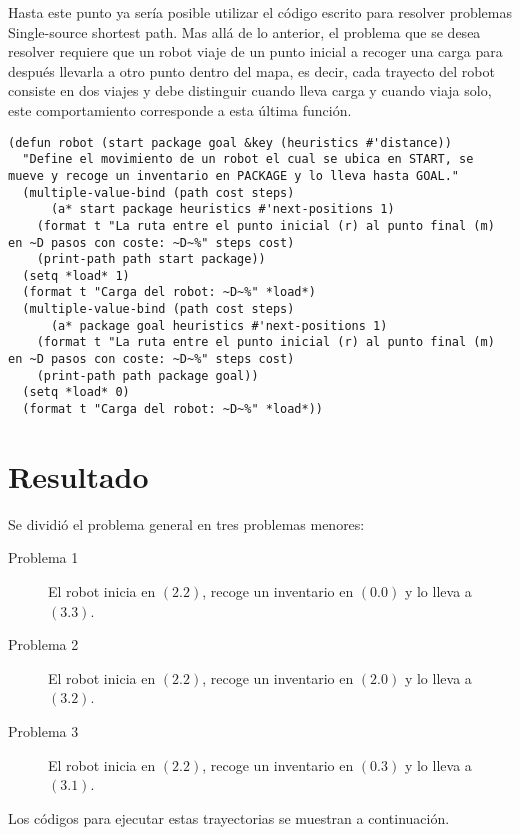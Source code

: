 \documentclass[a4paper,12pt]{article}
\begin{document}
Hasta este punto ya sería posible utilizar el código escrito para resolver problemas Single-source shortest path. Mas allá de lo anterior, el problema que se desea resolver requiere que un robot viaje de un punto inicial a recoger una carga para después llevarla a otro punto dentro del mapa, es decir, cada trayecto del robot consiste en dos viajes y debe distinguir cuando lleva carga y cuando viaja solo, este comportamiento corresponde a esta última función.

\lstset{language=Lisp,label= ,caption= ,captionpos=b,numbers=none,numbers=left}
\begin{lstlisting}
(defun robot (start package goal &key (heuristics #'distance))
  "Define el movimiento de un robot el cual se ubica en START, se mueve y recoge un inventario en PACKAGE y lo lleva hasta GOAL."
  (multiple-value-bind (path cost steps)
      (a* start package heuristics #'next-positions 1)
    (format t "La ruta entre el punto inicial (r) al punto final (m) en ~D pasos con coste: ~D~%" steps cost)
    (print-path path start package))
  (setq *load* 1)
  (format t "Carga del robot: ~D~%" *load*)
  (multiple-value-bind (path cost steps)
      (a* package goal heuristics #'next-positions 1)
    (format t "La ruta entre el punto inicial (r) al punto final (m) en ~D pasos con coste: ~D~%" steps cost)
    (print-path path package goal))
  (setq *load* 0)
  (format t "Carga del robot: ~D~%" *load*))
\end{lstlisting}

\section*{Resultado}
\label{sec:org1b87ad5}

Se dividió el problema general en tres problemas menores:

\begin{description}
\item[{Problema 1}] El robot inicia en \((2 . 2)\), recoge un inventario en \((0 . 0)\) y lo lleva a \((3 .3)\).
\item[{Problema 2}] El robot inicia en \((2 . 2)\), recoge un inventario en \((2 . 0)\) y lo lleva a \((3 .2)\).
\item[{Problema 3}] El robot inicia en \((2 . 2)\), recoge un inventario en \((0 . 3)\) y lo lleva a \((3 .1)\).
\end{description}

Los códigos para ejecutar estas trayectorias se muestran a continuación.
\end{document}

